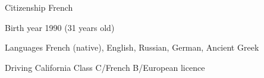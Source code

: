
\begin{cvskills}

	\cvskill
	{Citizenship}
    {French}

	\cvskill
	{Birth year}
    {1990 (31 years old)}

	\cvskill
	{Languages}
    {French (native), English, Russian, German, Ancient Greek}

	\cvskill
	{Driving}
    {California Class C/French B/European licence}

\end{cvskills}
